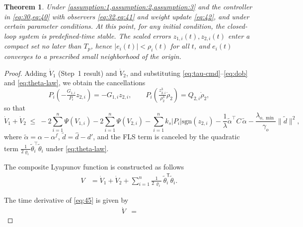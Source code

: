 \documentclass[pdflatex,sn-mathphys-num]{sn-jnl}%
\theoremstyle{thmstyleone}%
\newtheorem{theorem}{Theorem}%
\theoremstyle{thmstyletwo}%
\theoremstyle{thmstylethree}%
\begin{document}
 \begin{theorem}
	Under \cref{assumption:1,assumption:2,assumption:3} and the controller in \cref{eq:30,eq:40} with observers \cref{eq:32,eq:41} and weight update \cref{eq:42}, and under certain parameter conditions. At this point, for any initial condition, the closed-loop system is predefined-time stable. The scaled errors $z_{1,i}(t),z_{2,i}(t)$ enter a compact set no later than $T_p$, hence $|e_{i}(t)|<\rho_{i}(t)$ for all $t$, and $e_i(t)$ converges to a prescribed small neighborhood of the origin.
\end{theorem}


\begin{proof}
Adding $\dot V_1$ (Step~1 result) and $\dot V_2$, and substituting \eqref{eq:tau-cmd}–\eqref{eq:dob} and
\eqref{eq:theta-law}, we obtain the cancellations
\[
P_i\!\left(-\tfrac{G_{1,i}}{P_i}z_{2,i}\right)=-G_{1,i}z_{2,i},\qquad
P_i\!\left(\tfrac{z_{2,i}^3}{\rho_{2}^3}\dot\rho_{2}\right)=Q _{2,i}\dot\rho_{2},
\]
so that
\[
\dot V_1+\dot V_2
\;\le\;
-2\sum_{i=1}^n \Psi(V_{1,i})
-2\sum_{i=1}^n \Psi(V_{2,i})
-\sum_{i=1}^n k_s |P_i|\mathrm{sgn}(z_{2,i})
-\frac{1}{\lambda}\tilde\alpha^\top C\,\tilde\alpha
-\frac{\lambda_{o,\min}}{\gamma_o}\|\tilde d\|^2,
\]
where $\tilde\alpha=\alpha-\alpha^f$, $\tilde d=\hat d-d'$, and the FLS term is canceled by the quadratic term
$\frac{1}{2\varrho_i}\tilde\theta_i^\top\tilde\theta_i$ under \eqref{eq:theta-law}.


The composite Lyapunov function is constructed as follows
\begin{equation}\label{eq:45}
	\begin{aligned}
		V & =\dot V_1+\dot V_2+ \sum_{i=1}^n \frac{1}{2\,\varrho_i}\,\tilde \theta_{i}^\mathsf{T}\tilde \theta_{i}.
	\end{aligned}
\end{equation}

The time derivative of \cref{eq:45} is given by
\begin{equation}\label{eq:46}
	\begin{aligned}
		\dot{V}  & =
	\end{aligned}
\end{equation}



\end{proof}
\end{document}
